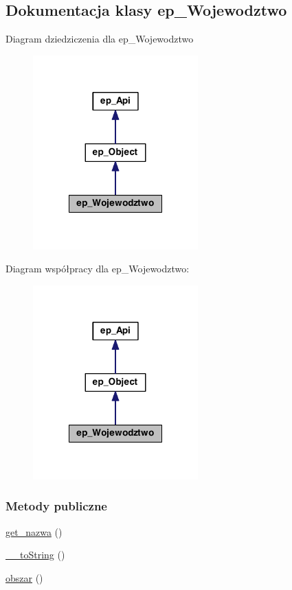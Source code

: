 \hypertarget{classep___wojewodztwo}{\subsection{Dokumentacja klasy ep\-\_\-\-Wojewodztwo}
\label{classep___wojewodztwo}
}


Diagram dziedziczenia dla ep\-\_\-\-Wojewodztwo\nopagebreak
\begin{figure}[H]
\begin{center}
\leavevmode
\includegraphics[width=180pt]{classep___wojewodztwo__inherit__graph}
\end{center}
\end{figure}


Diagram współpracy dla ep\-\_\-\-Wojewodztwo\-:\nopagebreak
\begin{figure}[H]
\begin{center}
\leavevmode
\includegraphics[width=180pt]{classep___wojewodztwo__coll__graph}
\end{center}
\end{figure}
\subsubsection*{Metody publiczne}
\begin{DoxyCompactItemize}
\item 
\hyperlink{classep___wojewodztwo_ac0818f0049d7b84f08f77128f54cee36}{get\-\_\-nazwa} ()
\item 
\hyperlink{classep___wojewodztwo_a7516ca30af0db3cdbf9a7739b48ce91d}{\-\_\-\-\_\-to\-String} ()
\item 
\hyperlink{classep___wojewodztwo_aa05db5ea090acb5d431aff0bbb8b97a6}{obszar} ()
\end{DoxyCompactItemize}
